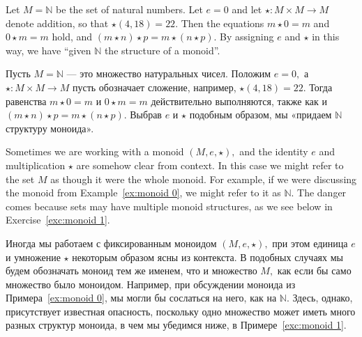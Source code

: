 \documentclass[../main/CT4S-EN-RU]{subfiles}
\begin{document}
\begin{exampleENG}\label{ex:monoid 0}
Let $M={ℕ}$ be the set of natural numbers. Let $e=0$ and let ${⋆}\colon M\times M{→} M$ denote addition, so that ${⋆}(4,18)=22.$ Then the equations $m{⋆} 0=m$ and $0{⋆} m=m$ hold, and $(m{⋆} n){⋆} p=m{⋆} (n{⋆} p).$ By assigning $e$ and ${⋆}$ in this way, we have “given ${ℕ}$ the structure of a monoid”.
\end{exampleENG}

\begin{exampleRUS}\label{ex:monoid 0}
Пусть $M={ℕ}$ — это множество натуральных чисел. Положим $e=0,$ а ${⋆}\colon M\times M{→} M$ пусть обозначает сложение, например, ${⋆}(4,18)=22.$ Тогда равенства $m{⋆} 0=m$ и $0{⋆} m=m$ действительно выполняются, также как и $(m{⋆} n){⋆} p=m{⋆} (n{⋆} p).$ Выбрав $e$ и ${⋆}$ подобным образом, мы «придаем ${ℕ}$ структуру моноида».
\end{exampleRUS}

\begin{remarkENG}
Sometimes we are working with a monoid $(M,e,{⋆}),$ and the identity $e$ and multiplication ${⋆}$ are somehow clear from context. In this case we might refer to the set $M$ as though it were the whole monoid. For example, if we were discussing the monoid from Example~\ref{ex:monoid 0}, we might refer to it as ${ℕ}.$ The danger comes because sets may have multiple monoid structures, as we see below in Exercise~\ref{exc:monoid 1}.
\end{remarkENG}

\begin{remarkRUS}
Иногда мы работаем с фиксированным моноидом $(M,e,{⋆}),$ при этом единица $e$ и умножение ${⋆}$ некоторым образом ясны из контекста. В подобных случаях мы будем обозначать моноид тем же именем, что и множество $M,$ как если бы само множество было моноидом. Например, при обсуждении моноида из Примера~\ref{ex:monoid 0}, мы могли бы сослаться на него, как на ${ℕ}.$ Здесь, однако, присутствует известная опасность, поскольку одно множество может иметь много разных структур моноида, в чем мы убедимся ниже, в Примере~\ref{exc:monoid 1}.
\end{remarkRUS}
\end{document}
